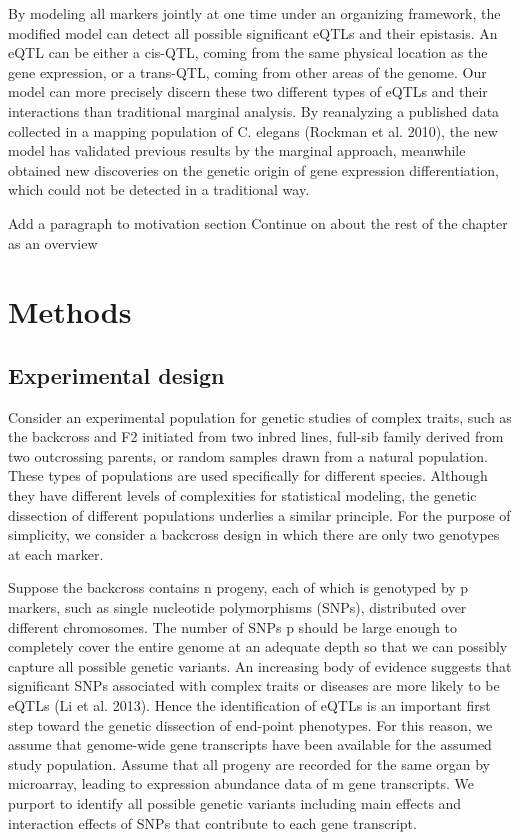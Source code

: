 \documentclass[]{book}
\theoremstyle{definition}
\theoremstyle{definition}
\theoremstyle{remark}
\begin{document}
By modeling all markers jointly at one time under an organizing
framework, the modified model can detect all possible significant eQTLs
and their epistasis. An eQTL can be either a cis-QTL, coming from the
same physical location as the gene expression, or a trans-QTL, coming
from other areas of the genome. Our model can more precisely discern
these two different types of eQTLs and their interactions than
traditional marginal analysis. By reanalyzing a published data collected
in a mapping population of C. elegans (Rockman et al. 2010), the new
model has validated previous results by the marginal approach, meanwhile
obtained new discoveries on the genetic origin of gene expression
differentiation, which could not be detected in a traditional way.

Add a paragraph to motivation section Continue on about the rest of the
chapter as an overview

\section{Methods}\label{methods}

\subsection{Experimental design}\label{experimental-design}

Consider an experimental population for genetic studies of complex
traits, such as the backcross and F2 initiated from two inbred lines,
full-sib family derived from two outcrossing parents, or random samples
drawn from a natural population. These types of populations are used
specifically for different species. Although they have different levels
of complexities for statistical modeling, the genetic dissection of
different populations underlies a similar principle. For the purpose of
simplicity, we consider a backcross design in which there are only two
genotypes at each marker.

Suppose the backcross contains n progeny, each of which is genotyped by
p markers, such as single nucleotide polymorphisms (SNPs), distributed
over different chromosomes. The number of SNPs p should be large enough
to completely cover the entire genome at an adequate depth so that we
can possibly capture all possible genetic variants. An increasing body
of evidence suggests that significant SNPs associated with complex
traits or diseases are more likely to be eQTLs (Li et al. 2013). Hence
the identification of eQTLs is an important first step toward the
genetic dissection of end-point phenotypes. For this reason, we assume
that genome-wide gene transcripts have been available for the assumed
study population. Assume that all progeny are recorded for the same
organ by microarray, leading to expression abundance data of m gene
transcripts. We purport to identify all possible genetic variants
including main effects and interaction effects of SNPs that contribute
to each gene transcript.
\end{document}
